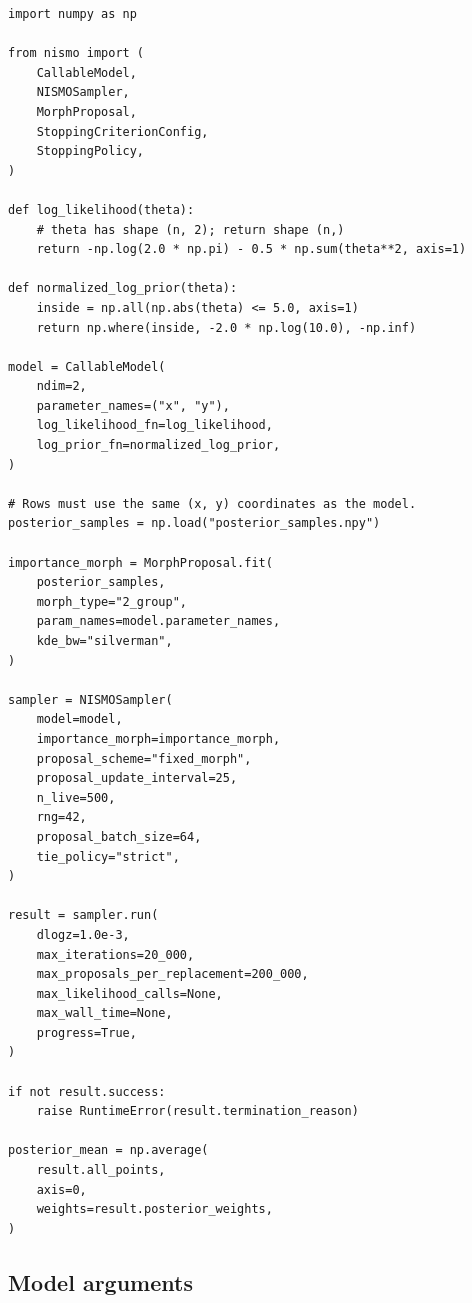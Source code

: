 \documentclass[11pt,a4paper]{article}
\begin{document}
\begin{lstlisting}
import numpy as np

from nismo import (
    CallableModel,
    NISMOSampler,
    MorphProposal,
    StoppingCriterionConfig,
    StoppingPolicy,
)

def log_likelihood(theta):
    # theta has shape (n, 2); return shape (n,)
    return -np.log(2.0 * np.pi) - 0.5 * np.sum(theta**2, axis=1)

def normalized_log_prior(theta):
    inside = np.all(np.abs(theta) <= 5.0, axis=1)
    return np.where(inside, -2.0 * np.log(10.0), -np.inf)

model = CallableModel(
    ndim=2,
    parameter_names=("x", "y"),
    log_likelihood_fn=log_likelihood,
    log_prior_fn=normalized_log_prior,
)

# Rows must use the same (x, y) coordinates as the model.
posterior_samples = np.load("posterior_samples.npy")

importance_morph = MorphProposal.fit(
    posterior_samples,
    morph_type="2_group",
    param_names=model.parameter_names,
    kde_bw="silverman",
)

sampler = NISMOSampler(
    model=model,
    importance_morph=importance_morph,
    proposal_scheme="fixed_morph",
    proposal_update_interval=25,
    n_live=500,
    rng=42,
    proposal_batch_size=64,
    tie_policy="strict",
)

result = sampler.run(
    dlogz=1.0e-3,
    max_iterations=20_000,
    max_proposals_per_replacement=200_000,
    max_likelihood_calls=None,
    max_wall_time=None,
    progress=True,
)

if not result.success:
    raise RuntimeError(result.termination_reason)

posterior_mean = np.average(
    result.all_points,
    axis=0,
    weights=result.posterior_weights,
)
\end{lstlisting}

\subsection{Model arguments}
\end{document}
